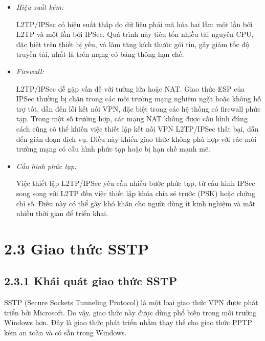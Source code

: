 \begin{itemize}
        \item \textit{Hiệu suất kém:}
        
        L2TP/IPSec có hiệu suất thấp do dữ liệu phải mã hóa hai lần: một lần bởi L2TP và một lần bởi IPSec. Quá trình này tiêu tốn nhiều tài nguyên CPU, đặc biệt trên thiết bị yếu, và làm tăng kích thước gói tin, gây giảm tốc độ truyền tải, nhất là trên mạng có băng thông hạn chế.
        \item \textit{Firewall:}

        L2TP/IPSec dễ gặp vấn đề với tường lửa hoặc NAT. Giao thức ESP của IPSec thường bị chặn trong các môi trường mạng nghiêm ngặt hoặc không hỗ trợ tốt, dẫn đến lỗi kết nối VPN, đặc biệt trong các hệ thống có firewall phức tạp. Trong một số trường hợp, các mạng NAT không được cấu hình đúng cách cũng có thể khiến việc thiết lập kết nối VPN L2TP/IPSec thất bại, dẫn đến gián đoạn dịch vụ. Điều này khiến giao thức không phù hợp với các môi trường mạng có cấu hình phức tạp hoặc bị hạn chế mạnh mẽ.

        \item \textit{Cấu hình phức tạp:}

        Việc thiết lập L2TP/IPSec yêu cầu nhiều bước phức tạp, từ cấu hình IPSec song song với L2TP đến việc thiết lập khóa chia sẻ trước (PSK) hoặc chứng chỉ số. Điều này có thể gây khó khăn cho người dùng ít kinh nghiệm và mất nhiều thời gian để triển khai.
    \end{itemize} 

  \section*{2.3 Giao thức SSTP}

 \subsection*{2.3.1 Khái quát giao thức SSTP}
 SSTP (Secure Sockets Tunneling Protocol) là một loại giao thức VPN được phát triển bởi Microsoft. Do vậy, giao thức này được dùng phổ biến trong môi trường Windows hơn. Đây là giao thức phát triển nhằm thay thế cho giao thức PPTP kém an toàn và có sẵn trong Windows.

